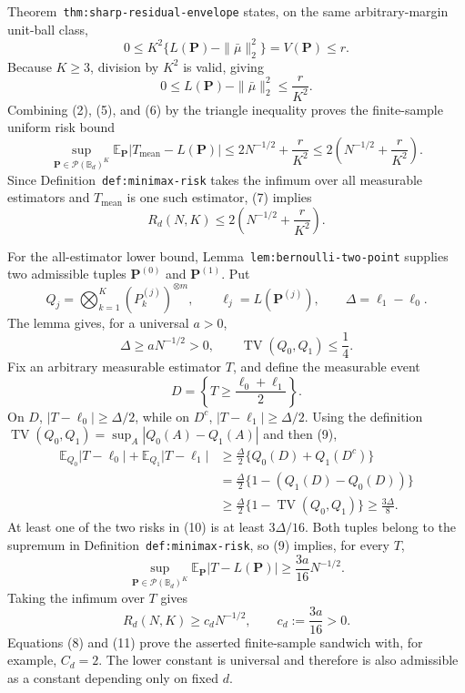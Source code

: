 Theorem~\texttt{thm:sharp-residual-envelope} states, on the same arbitrary-margin unit-ball class,
\[
0\leq K^2\{L(\mathbf P)-\|\bar\mu\|_2^2\}=V(\mathbf P)\leq r.
\]
Because \(K\geq3\), division by \(K^2\) is valid, giving
\[
0\leq L(\mathbf P)-\|\bar\mu\|_2^2\leq \frac r{K^2}.
\tag{6}
\]
Combining (2), (5), and (6) by the triangle inequality proves the finite-sample uniform risk bound
\[
\sup_{\mathbf P\in\mathcal P(\mathbb B_d)^K}
\mathbb E_{\mathbf P}|T_{\mathrm{mean}}-L(\mathbf P)|
\leq 2N^{-1/2}+\frac r{K^2}
\leq 2\left(N^{-1/2}+\frac r{K^2}\right).
\tag{7}
\]
Since Definition~\texttt{def:minimax-risk} takes the infimum over all measurable estimators and \(T_{\mathrm{mean}}\) is one such estimator, (7) implies
\[
R_d(N,K)\leq 2\left(N^{-1/2}+\frac r{K^2}\right).
\tag{8}
\]

For the all-estimator lower bound, Lemma~\texttt{lem:bernoulli-two-point} supplies two admissible tuples \(\mathbf P^{(0)}\) and \(\mathbf P^{(1)}\).  Put
\[
Q_j=\bigotimes_{k=1}^K(P_k^{(j)})^{\otimes m},
\qquad
\ell_j=L(\mathbf P^{(j)}),
\qquad
\Delta=\ell_1-\ell_0.
\]
The lemma gives, for a universal \(a>0\),
\[
\Delta\geq aN^{-1/2}>0,
\qquad
\operatorname{TV}(Q_0,Q_1)\leq\frac14.
\tag{9}
\]
Fix an arbitrary measurable estimator \(T\), and define the measurable event
\[
D=\left\{T\geq\frac{\ell_0+\ell_1}{2}\right\}.
\]
On \(D\), \(|T-\ell_0|\geq\Delta/2\), while on \(D^c\), \(|T-\ell_1|\geq\Delta/2\).  Using the definition \(\operatorname{TV}(Q_0,Q_1)=\sup_A|Q_0(A)-Q_1(A)|\) and then (9),
\[
\begin{aligned}
\mathbb E_{Q_0}|T-\ell_0|+\mathbb E_{Q_1}|T-\ell_1|
&\geq\frac\Delta2\{Q_0(D)+Q_1(D^c)\}\\
&=\frac\Delta2\{1-(Q_1(D)-Q_0(D))\}\\
&\geq\frac\Delta2\{1-\operatorname{TV}(Q_0,Q_1)\}
\geq\frac{3\Delta}{8}.
\end{aligned}
\tag{10}
\]
At least one of the two risks in (10) is at least \(3\Delta/16\).  Both tuples belong to the supremum in Definition~\texttt{def:minimax-risk}, so (9) implies, for every \(T\),
\[
\sup_{\mathbf P\in\mathcal P(\mathbb B_d)^K}
\mathbb E_{\mathbf P}|T-L(\mathbf P)|
\geq\frac{3a}{16}N^{-1/2}.
\]
Taking the infimum over \(T\) gives
\[
R_d(N,K)\geq c_dN^{-1/2},
\qquad c_d:=\frac{3a}{16}>0.
\tag{11}
\]
Equations (8) and (11) prove the asserted finite-sample sandwich with, for example, \(C_d=2\).  The lower constant is universal and therefore is also admissible as a constant depending only on fixed \(d\).

